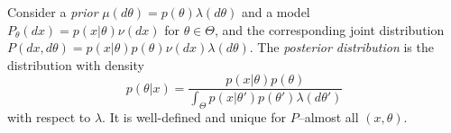 \documentclass[
	fontsize=11pt, %
	twoside=false, %
	numbers=noenddot, %
]{kaobook}
\begin{document}

\begin{definition}
	\label{def:posterior-distribution}
	Consider a \emph{prior} $\mu(d \theta) = p(\theta) \lambda(d \theta)$ and a model $P_\theta(dx) = p(x | \theta) \nu(dx)$ for $\theta \in \Theta$, and the corresponding joint distribution $P(dx, d\theta) = p(x | \theta) p(\theta) \nu(dx) \lambda(d \theta)$.
	The \emph{posterior distribution} is the distribution with density
	\begin{equation*}
		p(\theta | x) = \frac{p(x | \theta) p(\theta)}{\int_\Theta p(x | \theta') p(\theta') \lambda(d \theta')}
	\end{equation*}
	with respect to $\lambda$. 
	It is well-defined and unique for $P$--almost all $(x, \theta)$.
\end{definition}
\end{document}
